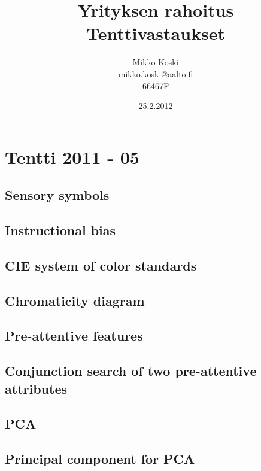 \documentclass[a4paper]{article}
\begin{document}
\title{\small Yrityksen rahoitus \\ \huge Tenttivastaukset}
\date{25.2.2012}
\author{Mikko Koski \\ mikko.koski@aalto.fi \\ 66467F}
\maketitle

\normalsize
\setlength{\parindent}{0cm}

\section{Tentti 2011 - 05}

\subsection{Sensory symbols}

\subsection{Instructional bias}

\subsection{CIE system of color standards}

\subsection{Chromaticity diagram}

\subsection{Pre-attentive features}

\subsection{Conjunction search of two pre-attentive attributes}

\subsection{PCA}

\subsection{Principal component for PCA}
\end{document}
